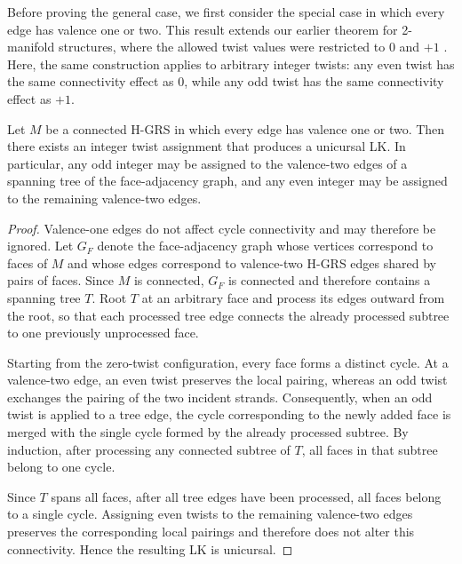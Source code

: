 \documentclass[acmtog]{acmart}
\begin{document}
Before proving the general case, we first consider the special case in which every edge has valence one or two. This result extends our earlier theorem for 2-manifold structures, where the allowed twist values were restricted to $0$ and $+1$ \cite{xing2010single}. Here, the same construction applies to arbitrary integer twists: any even twist has the same connectivity effect as $0$, while any odd twist has the same connectivity effect as $+1$.

\begin{theorem} Let $M$ be a connected H-GRS in which every edge has valence one or two. Then there exists an integer twist assignment that produces a unicursal LK. In particular, any odd integer may be assigned to the valence-two edges of a spanning tree of the face-adjacency graph, and any even integer may be assigned to the remaining valence-two edges. \end{theorem}

\begin{proof} Valence-one edges do not affect cycle connectivity and may therefore be ignored. Let $G_F$ denote the face-adjacency graph whose vertices correspond to faces of $M$ and whose edges correspond to valence-two H-GRS edges shared by pairs of faces. Since $M$ is connected, $G_F$ is connected and therefore contains a spanning tree $T$. Root $T$ at an arbitrary face and process its edges outward from the root, so that each processed tree edge connects the already processed subtree to one previously unprocessed face.

Starting from the zero-twist configuration, every face forms a distinct cycle. At a valence-two edge, an even twist preserves the local pairing, whereas an odd twist exchanges the pairing of the two incident strands. Consequently, when an odd twist is applied to a tree edge, the cycle corresponding to the newly added face is merged with the single cycle formed by the already processed subtree. By induction, after processing any connected subtree of $T$, all faces in that subtree belong to one cycle.

Since $T$ spans all faces, after all tree edges have been processed, all faces belong to a single cycle. Assigning even twists to the remaining valence-two edges preserves the corresponding local pairings and therefore does not alter this connectivity. Hence the resulting LK is unicursal. \end{proof}
\end{document}
